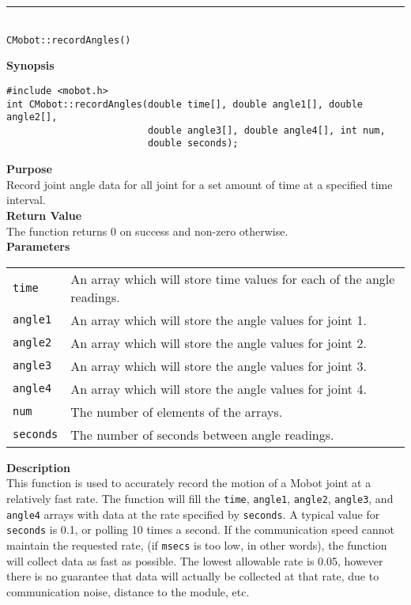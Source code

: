 \noindent
\vspace{5pt}
\rule{4.5in}{0.015in}\\
\noindent
{\LARGE \texttt{CMobot::recordAngles()}}\\
{}

\noindent
{\bf Synopsis}
\vspace{-8pt}
\begin{verbatim}
#include <mobot.h>
int CMobot::recordAngles(double time[], double angle1[], double angle2[], 
                         double angle3[], double angle4[], int num, 
                         double seconds);
\end{verbatim}

\noindent
{\bf Purpose}\\
Record joint angle data for all joint for a set amount of time at a specified time interval.\\

\noindent
{\bf Return Value}\\
The function returns 0 on success and non-zero otherwise.\\

\noindent
{\bf Parameters}\\
\vspace{-0.1in}
\begin{description}
\item               
\begin{tabular}{p{15 mm}p{145 mm}}
\texttt{time} & An array which will store time values for each of the angle readings. \\
\texttt{angle1} & An array which will store the angle values for joint 1. \\
\texttt{angle2} & An array which will store the angle values for joint 2. \\
\texttt{angle3} & An array which will store the angle values for joint 3. \\
\texttt{angle4} & An array which will store the angle values for joint 4. \\
\texttt{num} & The number of elements of the arrays. \\
\texttt{seconds} & The number of seconds between angle readings.
\end{tabular}
\end{description}

\noindent
{\bf Description}\\
This function is used to accurately record the motion of a Mobot joint at a relatively fast
rate. The function will fill the \texttt{time}, \texttt{angle1},
\texttt{angle2}, \texttt{angle3}, and \texttt{angle4} arrays with data
at the rate specified by \texttt{seconds}. A typical value for \texttt{seconds} is 0.1, or
polling 10 times a second. If the communication speed cannot maintain 
the requested rate, (if \texttt{msecs} is too low, in other words), the function will
collect data as fast as possible. The lowest allowable rate is 0.05, however there is
no guarantee that data will actually be collected at that rate, due to communication noise,
distance to the module, etc.

